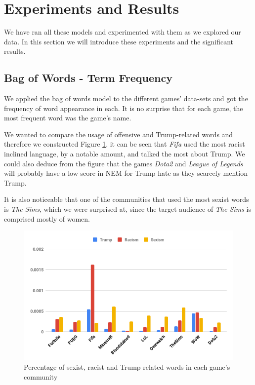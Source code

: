 \section{Experiments and Results}
We have ran all these models and experimented with them as we explored our data. In this section we will introduce these experiments and the significant results.

\subsection{Bag of Words - Term Frequency}
We applied the bag of words model to the different games' data-sets and got the frequency of word appearance in each. It is no surprise that for each game, the most frequent word was the game's name.

We wanted to compare the usage of offensive and Trump-related words and therefore we constructed Figure \ref{fig:bow-statistics}, it can be seen that \emph{Fifa} used the most racist inclined language, by a notable amount, and talked the most about Trump. We could also deduce from the figure that the games \emph{Dota2} and \emph{League of Legends} will probably have a low score in NEM for Trump-hate as they scarcely mention Trump.

It is also noticeable that one of the communities that used the most sexist words is \emph{The Sims}, which we were surprised at, since the target audience of \emph{The Sims} is comprised mostly of women. 

\begin{figure}[h]
    \begin{center}
        \includegraphics[scale=0.33]{Images/bow-statistics.png}
    \end{center}
    \caption{Percentage of sexist, racist and Trump related words in each game's community}
    \label{fig:bow-statistics}
\end{figure}


